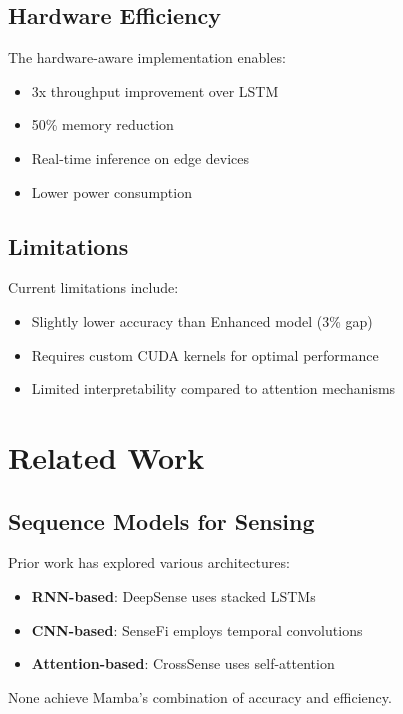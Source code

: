 \documentclass[10pt,conference]{IEEEtran}
\begin{document}
\subsection{Hardware Efficiency}

The hardware-aware implementation enables:
\begin{itemize}
    \item 3x throughput improvement over LSTM
    \item 50\% memory reduction
    \item Real-time inference on edge devices
    \item Lower power consumption
\end{itemize}

\subsection{Limitations}

Current limitations include:
\begin{itemize}
    \item Slightly lower accuracy than Enhanced model (3\% gap)
    \item Requires custom CUDA kernels for optimal performance
    \item Limited interpretability compared to attention mechanisms
\end{itemize}

\section{Related Work}
\label{sec:related}

\subsection{Sequence Models for Sensing}

Prior work has explored various architectures:
\begin{itemize}
    \item \textbf{RNN-based}: DeepSense \cite{deepsense} uses stacked LSTMs
    \item \textbf{CNN-based}: SenseFi \cite{yang2023sensefi} employs temporal convolutions
    \item \textbf{Attention-based}: CrossSense uses self-attention
\end{itemize}

None achieve Mamba's combination of accuracy and efficiency.
\end{document}
